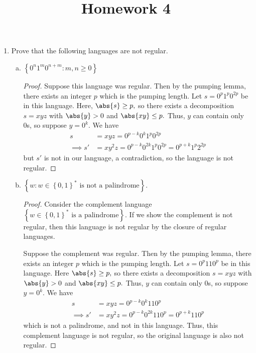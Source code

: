\documentclass{article}
\begin{document}
\title{Homework 4}
\maketitle
\thispagestyle{fancy}

\begin{enumerate}
	\item Prove that the following languages are not regular.
		\begin{enumerate}[(a)]
			\item $\left\{ 0^n1^m0^{n+m}:m, n\ge 0 \right\}$
				\begin{proof}
					Suppose this language was regular. Then by the pumping lemma, there exists an integer $p$ which is the pumping length. Let $s=0^p 1^p 0^{2p}$ be in this language. Here, $\abs{s}\ge p,$ so there exists a decomposition $s=xyz$ with $\abs{y}>0$ and $\abs{xy}\le p.$ Thus, $y$ can contain only 0s, so suppose $y=0^k.$ We have
					\begin{align*}
						s &= xyz = 0^{p-k}0^k1^p0^{2p} \\
						\implies s' &= xy^2z = 0^{p-k}0^{2k} 1^p 0^{2p} = 0^{p+k}1^p 2^{2p}
					\end{align*}
					but $s'$ is not in our language, a contradiction, so the language is not regular.
				\end{proof}

			\item $\left\{ w:w\in\left\{ 0, 1 \right\}^*\text{ is not a palindrome} \right\}.$
				\begin{proof}
					Consider the complement language $\left\{ w\in\left\{ 0, 1 \right\}^*\text{ is a palindrome} \right\}.$ If we show the complement is not regular, then this language is not regular by the closure of regular languages. 

					Suppose the complement was regular. Then by the pumping lemma, there exists an integer $p$ which is the pumping length. Let $s=0^p110^p$ be in this language. Here $\abs{s}\ge p,$ so there exists a decomposition $s=xyz$ with $\abs{y}>0$ and $\abs{xy}\le p.$ Thus, $y$ can contain only 0s, so suppose $y=0^k.$ We have
					\begin{align*}
						s &= xyz = 0^{p-k}0^k 11 0^p \\
						\implies s' &= xy^2z = 0^{p-k}0^{2k}110^p = 0^{p+k}110^{p}
					\end{align*}
					which is not a palindrome, and not in this language. Thus, this complement language is not regular, so the original language is also not regular.
				\end{proof}
				

\end{enumerate}
\end{enumerate}
\end{document}
